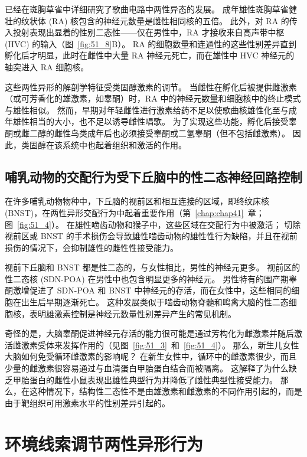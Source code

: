 已经在斑胸草雀中详细研究了歌曲电路中两性异态的发展。
成年雄性斑胸草雀健壮的纹状体 (RA) 核包含的神经元数量是雌性相同核的五倍。
此外，对 RA 的传入投射表现出显着的性别二态性——仅在男性中，RA 才接收来自高声带中枢 (HVC) 的输入（图~\ref{fig:51_8}B）。
RA 的细胞数量和连通性的这些性别差异直到孵化后才明显，此时在雌性中大量 RA 神经元死亡，而在雄性中 HVC 神经元的轴突进入 RA 细胞核。


这些两性异形的解剖学特征受类固醇激素的调节。
当雌性在孵化后被提供雌激素（或可芳香化的雄激素，如睾酮）时，RA 中的神经元数量和细胞核中的终止模式与雄性相似。
然而，早期对年轻雌性进行激素给药不足以使歌曲核雄性化至与成年雄性相当的大小，也不足以诱导雌性唱歌。
为了实现这些功能，孵化后接受睾酮或雌二醇的雌性鸟类成年后也必须接受睾酮或二氢睾酮（但不包括雌激素）。
因此，类固醇在该系统中也起着组织和激活的作用。



\subsection{哺乳动物的交配行为受下丘脑中的性二态神经回路控制}

在许多哺乳动物物种中，下丘脑的视前区和相互连接的区域，即终纹床核 (BNST)，在两性异形交配行为中起着重要作用（第~\ref{chap:chap41}~章；图~\ref{fig:51_4}）。
在雄性啮齿动物和猴子中，这些区域在交配行为中被激活；
切除视前区或 BNST 的手术损伤会导致雄性啮齿动物的雄性性行为缺陷，并且在视前损伤的情况下，会抑制雄性的雌性性接受能力。


视前下丘脑和 BNST 都是性二态的，与女性相比，男性的神经元更多。
视前区的性二态核 (SDN-POA) 在男性中也包含明显更多的神经元。
男性特有的围产期睾酮激增促进了 SDN-POA 和 BNST 中神经元的存活，而在女性中，这些相同的细胞在出生后早期逐渐死亡。
这种发展类似于啮齿动物脊髓和鸣禽大脑的性二态细胞核，表明雄激素控制是神经元数量性别差异产生的常见机制。


奇怪的是，大脑睾酮促进神经元存活的能力很可能是通过芳构化为雌激素并随后激活雌激素受体来发挥作用的（见图~\ref{fig:51_3}~和~\ref{fig:51_4}）。
那么，新生儿女性大脑如何免受循环雌激素的影响呢？
在新生女性中，循环中的雌激素很少，而且少量的雌激素很容易通过与血清蛋白甲胎蛋白结合而被隔离。
这解释了为什么缺乏甲胎蛋白的雌性小鼠表现出雄性典型行为并降低了雌性典型性接受能力。
那么，在这种情况下，结构性二态性不是由雄激素和雌激素的不同作用引起的，而是由于靶组织可用激素水平的性别差异引起的。



\section{环境线索调节两性异形行为}


